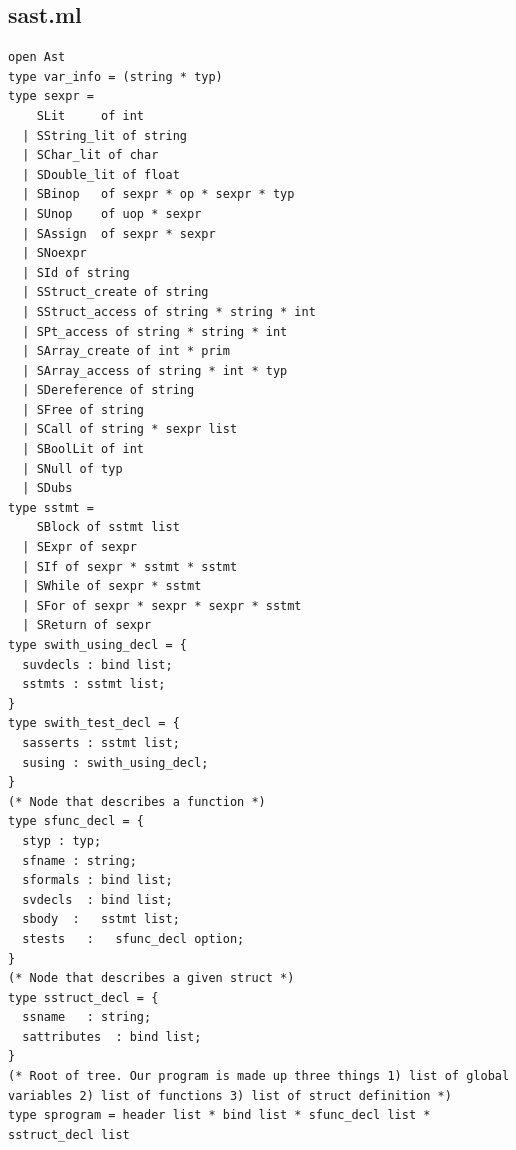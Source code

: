 \documentclass{article}
\begin{document}
\subsection{sast.ml}
\begin{lstlisting}
open Ast
type var_info = (string * typ)
type sexpr =
    SLit     of int
  | SString_lit of string
  | SChar_lit of char
  | SDouble_lit of float
  | SBinop   of sexpr * op * sexpr * typ
  | SUnop    of uop * sexpr
  | SAssign  of sexpr * sexpr
  | SNoexpr
  | SId of string
  | SStruct_create of string
  | SStruct_access of string * string * int
  | SPt_access of string * string * int
  | SArray_create of int * prim
  | SArray_access of string * int * typ
  | SDereference of string
  | SFree of string
  | SCall of string * sexpr list
  | SBoolLit of int
  | SNull of typ
  | SDubs
type sstmt =
    SBlock of sstmt list   
  | SExpr of sexpr
  | SIf of sexpr * sstmt * sstmt
  | SWhile of sexpr * sstmt
  | SFor of sexpr * sexpr * sexpr * sstmt
  | SReturn of sexpr
type swith_using_decl = {
  suvdecls : bind list;
  sstmts : sstmt list;
}
type swith_test_decl = {
  sasserts : sstmt list;
  susing : swith_using_decl;
}
(* Node that describes a function *)
type sfunc_decl = {
  styp : typ;
  sfname : string;
  sformals : bind list;
  svdecls  : bind list;
  sbody  :   sstmt list;
  stests   :   sfunc_decl option;
}
(* Node that describes a given struct *)
type sstruct_decl = {
  ssname   : string;
  sattributes  : bind list;
}
(* Root of tree. Our program is made up three things 1) list of global variables 2) list of functions 3) list of struct definition *)
type sprogram = header list * bind list * sfunc_decl list * sstruct_decl list
\end{lstlisting}
\newpage
\end{document}
